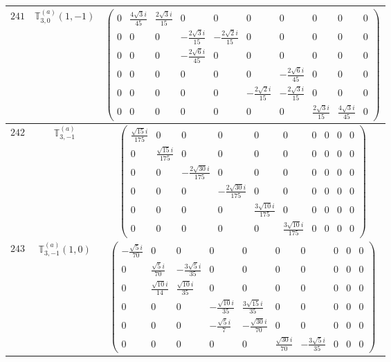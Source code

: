 \documentclass[fleqn,8pt,landscape]{jsarticle}
\begin{document}
\begin{center}
\begin{longtable}{ccc}
$ 241 $ & $ \mathbb{T}_{3,0}^{(a)}(1,-1) $ & $ \begin{pmatrix} 0 & \frac{4 \sqrt{3} i}{45} & \frac{2 \sqrt{3} i}{15} & 0 & 0 & 0 & 0 & 0 & 0 & 0 \\ 0 & 0 & 0 & - \frac{2 \sqrt{3} i}{15} & - \frac{2 \sqrt{2} i}{15} & 0 & 0 & 0 & 0 & 0 \\ 0 & 0 & 0 & - \frac{2 \sqrt{6} i}{45} & 0 & 0 & 0 & 0 & 0 & 0 \\ 0 & 0 & 0 & 0 & 0 & 0 & - \frac{2 \sqrt{6} i}{45} & 0 & 0 & 0 \\ 0 & 0 & 0 & 0 & 0 & - \frac{2 \sqrt{2} i}{15} & - \frac{2 \sqrt{3} i}{15} & 0 & 0 & 0 \\ 0 & 0 & 0 & 0 & 0 & 0 & 0 & \frac{2 \sqrt{3} i}{15} & \frac{4 \sqrt{3} i}{45} & 0 \end{pmatrix} $ \\ \hline
$ 242 $ & $ \mathbb{T}_{3,-1}^{(a)} $ & $ \begin{pmatrix} \frac{\sqrt{15} i}{175} & 0 & 0 & 0 & 0 & 0 & 0 & 0 & 0 & 0 \\ 0 & \frac{\sqrt{15} i}{175} & 0 & 0 & 0 & 0 & 0 & 0 & 0 & 0 \\ 0 & 0 & - \frac{2 \sqrt{30} i}{175} & 0 & 0 & 0 & 0 & 0 & 0 & 0 \\ 0 & 0 & 0 & - \frac{2 \sqrt{30} i}{175} & 0 & 0 & 0 & 0 & 0 & 0 \\ 0 & 0 & 0 & 0 & \frac{3 \sqrt{10} i}{175} & 0 & 0 & 0 & 0 & 0 \\ 0 & 0 & 0 & 0 & 0 & \frac{3 \sqrt{10} i}{175} & 0 & 0 & 0 & 0 \end{pmatrix} $ \\ \hline
$ 243 $ & $ \mathbb{T}_{3,-1}^{(a)}(1,0) $ & $ \begin{pmatrix} - \frac{\sqrt{5} i}{70} & 0 & 0 & 0 & 0 & 0 & 0 & 0 & 0 & 0 \\ 0 & \frac{\sqrt{5} i}{70} & - \frac{3 \sqrt{5} i}{35} & 0 & 0 & 0 & 0 & 0 & 0 & 0 \\ 0 & \frac{\sqrt{10} i}{14} & \frac{\sqrt{10} i}{35} & 0 & 0 & 0 & 0 & 0 & 0 & 0 \\ 0 & 0 & 0 & - \frac{\sqrt{10} i}{35} & \frac{3 \sqrt{15} i}{35} & 0 & 0 & 0 & 0 & 0 \\ 0 & 0 & 0 & - \frac{\sqrt{5} i}{7} & - \frac{\sqrt{30} i}{70} & 0 & 0 & 0 & 0 & 0 \\ 0 & 0 & 0 & 0 & 0 & \frac{\sqrt{30} i}{70} & - \frac{3 \sqrt{5} i}{35} & 0 & 0 & 0 \end{pmatrix} $ \\ \hline

\end{longtable}
\end{center}
\end{document}
